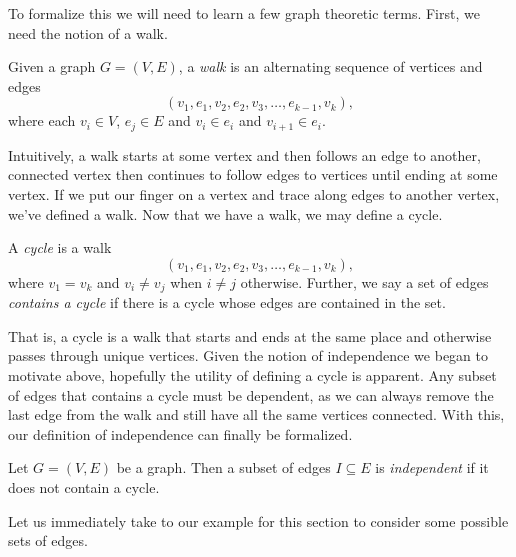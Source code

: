 \documentclass[12pt,oneside]{../../sfsuthesis}
\begin{document}
To formalize this we will need to learn a few graph theoretic terms.
First, we need the notion of a walk.
\begin{definition}[Walk]
    Given a graph \( G = (V, E) \), a \emph{walk} is an alternating sequence of vertices and edges
    \[
        (v_1, e_1, v_2, e_2, v_3, \ldots, e_{k-1}, v_k),
    \]
    where each \( v_i \in V \), \( e_j \in E \) and \( v_i \in e_i \) and \( v_{i+1} \in e_i \).
\end{definition}
Intuitively, a walk starts at some vertex and then follows an edge to another, connected vertex then continues to follow edges to vertices until ending at some vertex.
If we put our finger on a vertex and trace along edges to another vertex, we've defined a walk.
Now that we have a walk, we may define a cycle.
\begin{definition}[Cycle]
    A \emph{cycle} is a walk
    \[
        (v_1, e_1, v_2, e_2, v_3, \ldots, e_{k-1}, v_k),
    \]
    where \( v_1 = v_k \) and \( v_i \neq v_j \) when \( i \neq j \) otherwise.
    Further, we say a set of edges \emph{contains a cycle} if there is a cycle whose edges are contained in the set.
\end{definition}
That is, a cycle is a walk that starts and ends at the same place and otherwise passes through unique vertices.
Given the notion of independence we began to motivate above, hopefully the utility of defining a cycle is apparent.
Any subset of edges that contains a cycle must be dependent, as we can always remove the last edge from the walk and still have all the same vertices connected.
With this, our definition of independence can finally be formalized.

\begin{definition}
    Let \( G = (V, E) \) be a graph.
    Then a subset of edges \( I \subseteq E \) is \emph{independent} if it does not contain a cycle.
\end{definition}

Let us immediately take to our example for this section to consider some possible sets of edges.
\end{document}
